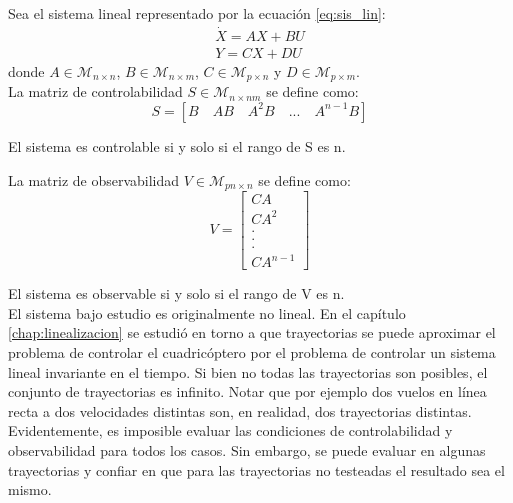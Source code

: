 \documentclass[main]{subfiles}
\begin{document}
Sea el sistema lineal representado por la ecuaci\'on \ref{eq:sis_lin}:
\begin{equation}
\label{eq:sis_lin}
\begin{array}{c}
\dot{X} = AX+BU \\
Y = CX+DU
\end{array}
\end{equation}
donde $A \in \mathcal{M}_{n \times n}$, $B \in \mathcal{M}_{n \times m}$, $C \in \mathcal{M}_{p \times n}$ y $D \in \mathcal{M}_{p \times m}$.\\

La matriz de controlabilidad $S\in \mathcal{M}_{n \times nm}$  se define como:
\begin{equation}
\label{eq:contr}
S = [B \quad AB \quad A^2B \quad ...\quad A^{n-1}B]
\end{equation}

El sistema es controlable si y solo si el rango de S es n. 

La matriz de observabilidad $V\in \mathcal{M}_{pn \times n}$ se define como:
\begin{equation}
\label{eq:obs}
V=
\left[
\begin{array}{c}
 CA\\
CA^2\\
.\\
.\\
.\\
CA^{n-1}
\end{array}\right]
\end{equation}

El sistema es observable si y solo si el rango de V es n.\\

El sistema bajo estudio es originalmente no lineal. En el cap\'itulo \ref{chap:linealizacion} se estudi\'o en torno a que trayectorias se puede aproximar el problema de controlar el cuadric\'optero por el problema de controlar un sistema lineal invariante en el tiempo. Si bien no todas las trayectorias son posibles, el conjunto de trayectorias es infinito. Notar que por ejemplo dos vuelos en l\'inea recta a dos velocidades distintas son, en realidad, dos trayectorias distintas. Evidentemente, es imposible evaluar las condiciones de controlabilidad y observabilidad para todos los casos. Sin embargo, se puede evaluar en algunas trayectorias y confiar en que para las trayectorias no testeadas el resultado sea el mismo.\\
\end{document}

